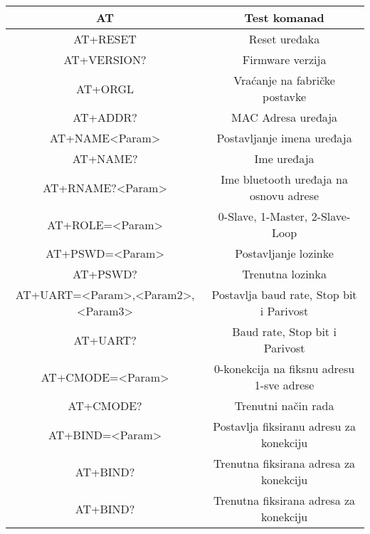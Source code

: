 \documentclass[../Document.tex]{subfiles}
\begin{document}
\begin{table}[h]
    \def\arraystretch{1.5}
    \centering
    \begin{tabular}{ |c|c| }
        \hline
        AT                                & Test komanad                              \\\hline
        AT+RESET                          & Reset uređaka                             \\\hline
        AT+VERSION?                       & Firmware verzija                          \\\hline
        AT+ORGL                           & Vraćanje na fabričke postavke             \\\hline
        AT+ADDR?                          & MAC Adresa uređaja                        \\\hline
        AT+NAME<Param>                    & Postavljanje imena uređaja                \\\hline
        AT+NAME?                          & Ime uređaja                               \\\hline
        AT+RNAME?<Param>                  & Ime bluetooth uređaja na osnovu adrese    \\\hline
        AT+ROLE=<Param>                   & 0-Slave, 1-Master, 2-Slave-Loop           \\\hline
        AT+PSWD=<Param>                   & Postavljanje lozinke                      \\\hline
        AT+PSWD?                          & Trenutna lozinka                          \\\hline
        AT+UART=<Param>,<Param2>,<Param3> & Postavlja baud rate, Stop bit i Parivost  \\\hline
        AT+UART?                          & Baud rate, Stop bit i Parivost            \\\hline
        AT+CMODE=<Param>                  & 0-konekcija na fiksnu adresu 1-sve adrese \\\hline
        AT+CMODE?                         & Trenutni način rada                       \\\hline
        AT+BIND=<Param>                   & Postavlja fiksiranu adresu za konekciju   \\\hline
        AT+BIND?                          & Trenutna fiksirana adresa za konekciju    \\\hline
        AT+BIND?                          & Trenutna fiksirana adresa za konekciju    \\\hline

\end{tabular}
\end{table}
\end{document}
